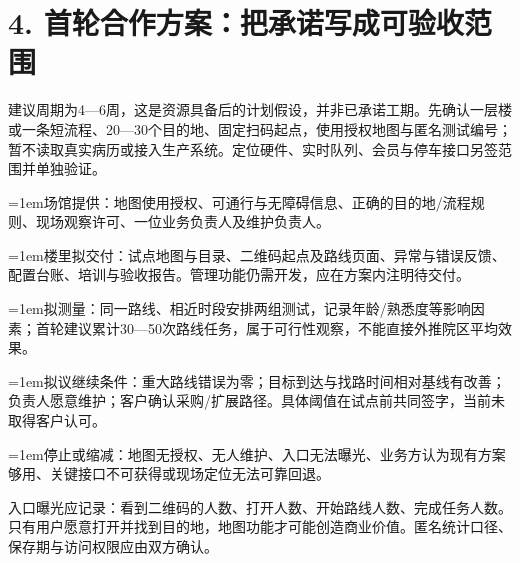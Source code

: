 \documentclass[UTF8,10pt,fontset=fandol]{ctexart}
\begin{document}
\section*{4. 首轮合作方案：把承诺写成可验收范围}
建议周期为4—6周，这是资源具备后的计划假设，并非已承诺工期。先确认一层楼或一条短流程、20—30个目的地、固定扫码起点，使用授权地图与匿名测试编号；暂不读取真实病历或接入生产系统。定位硬件、实时队列、会员与停车接口另签范围并单独验证。\par
\par\hangindent=1em\textcolor{brand}{\textbullet}\quad 场馆提供：地图使用授权、可通行与无障碍信息、正确的目的地/流程规则、现场观察许可、一位业务负责人及维护负责人。\par
\par\hangindent=1em\textcolor{brand}{\textbullet}\quad 楼里拟交付：试点地图与目录、二维码起点及路线页面、异常与错误反馈、配置台账、培训与验收报告。管理功能仍需开发，应在方案内注明待交付。\par
\par\hangindent=1em\textcolor{brand}{\textbullet}\quad 拟测量：同一路线、相近时段安排两组测试，记录年龄/熟悉度等影响因素；首轮建议累计30—50次路线任务，属于可行性观察，不能直接外推院区平均效果。\par
\par\hangindent=1em\textcolor{brand}{\textbullet}\quad 拟议继续条件：重大路线错误为零；目标到达与找路时间相对基线有改善；负责人愿意维护；客户确认采购/扩展路径。具体阈值在试点前共同签字，当前未取得客户认可。\par
\par\hangindent=1em\textcolor{brand}{\textbullet}\quad 停止或缩减：地图无授权、无人维护、入口无法曝光、业务方认为现有方案够用、关键接口不可获得或现场定位无法可靠回退。\par
入口曝光应记录：看到二维码的人数、打开人数、开始路线人数、完成任务人数。只有用户愿意打开并找到目的地，地图功能才可能创造商业价值。匿名统计口径、保存期与访问权限应由双方确认。\par
\end{document}
